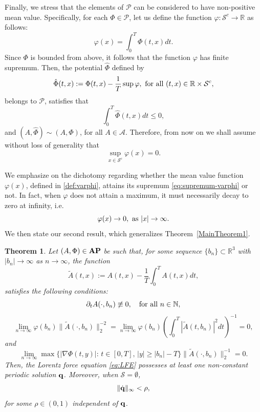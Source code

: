 \documentclass{article}
\newcommand{\R}{\mathbb{R}}
\newcommand{\boA}{\mathcal{A}}
\newcommand{\boP}{\mathcal{P}}
\newcommand{\boS}{\mathcal{S}}
\newcommand{\AP}{\textnormal{\textbf{AP}}}
\newtheorem{theorem}{Theorem}[section]
\theoremstyle{definition}
\begin{document}
Finally, we stress that the elements of $\boP$ can be considered to have non-positive mean value. Specifically, for each $\Phi\in\boP$, let us define the function $\varphi:\boS^c\to\R$ as follows:
	\begin{equation}\label{def:varphi}
		\varphi(x)=\int_0^T\Phi(t,x)dt.
	\end{equation}
    Since $\Phi$ is bounded from above, it follows that the function $\varphi$ has finite supremum. Then, the potential $\hat{\Phi}$ defined by
	\begin{equation}
		\hat{\Phi}(t,x):=\Phi(t,x)-\frac1T \sup\varphi,\ \hbox{for all }(t,x)\in\R\times\boS^c, 
	\end{equation}
    belongs to $\boP$, satisfies that
    \[\int_0^T\hat\Phi(t,x)dt\leq 0,\]
    and $(A,\hat{\Phi})\sim(A,\Phi)$, for all $A\in\boA$. Therefore, from now on we shall assume without loss of generality that
	\begin{equation}\label{eq:supremum-varphi}
		\sup\limits_{x\in\boS^c}\varphi(x)=0.
	\end{equation}
    
    We emphasize on the dichotomy regarding whether the mean value function $\varphi(x)$, defined in \eqref{def:varphi}, attains its supremum \eqref{eq:supremum-varphi} or not. In fact, when $\varphi$ does not attain a maximum, it must necessarily decay to zero at infinity, i.e.
\begin{equation}\label{cond:decay-varphi}
	\varphi(x)\to0,\hbox{ as }|x|\to\infty.
\end{equation}We then state our second result, which generalizes Theorem~\ref{MainTheorem1}.


\begin{theorem}\label{MainTheorem2}
Let $(A,\Phi)\in\AP$ be such that, for some sequence $\{b_n\}\subset\R^3$ with $|b_n|\to\infty$ as $n\to\infty$, the function
\begin{equation}
	\tilde{A}(t,x):=A(t,x)-\dfrac{1}{T}\int_{0}^{T}A(t,x)dt,
\end{equation}
satisfies the following conditions:
\begin{equation}\label{cond:varphi0}
    \partial_t A(\cdot,b_n)\not\equiv 0,\quad\hbox{for all }n\in\mathbb{N},
\end{equation}
\begin{equation}\label{cond:varphi1}
	    \lim\limits_{n\to\infty}\varphi(b_n)\|\tilde A(\cdot,b_n)\|^{-2}_2=\lim\limits_{n\to\infty}\varphi(b_n)\left(\int_0^T\left|\tilde A(t,b_n)\right|^2dt\right)^{-1}=0,
\end{equation}
and
\begin{equation}\label{cond:varphi2}
	\lim_{n\to\infty}\max\{|\nabla\Phi(t,y)|:\,t\in[0,T],\,|y|\geq |b_n|-T\}\|\tilde A(\cdot,b_n)\|^{-1}_2=0.
\end{equation}
Then, the Lorentz force equation \eqref{eq:LFE} possesses at least one non-constant periodic solution ${\bf q}$. Moreover, when $\boS=\emptyset$,
\begin{equation}
	\|\dot{{\bf q}}\|_\infty<\rho,
\end{equation}
for some $\rho\in(0,1)$ independent of ${\bf q}$.
\end{theorem}
\end{document}
